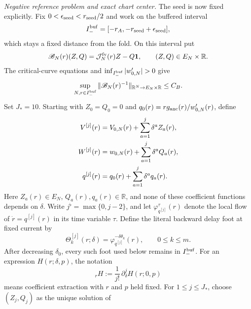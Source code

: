 \begin{lemma}
\smallskip
\noindent
\emph{Negative reference problem and exact chart center.}
The seed is now fixed explicitly.  Fix
\(0<\epsilon_{\rm seed}<r_{\rm seed}/2\) and work on the buffered interval
\[
 I_-^{\rm buf}=[-r_A,-r_{\rm seed}+\epsilon_{\rm seed}],
\]
which stays a fixed distance from the fold.  On this interval put
\begin{equation}
 \mathscr B_N(r)(Z,Q)
 =\mathcal J_N^{\rm fv}(r)Z-Q\mathbf1,\qquad
 (Z,Q)\in E_N\times\mathbb R .                       \label{eq:anchor-seed-normal-block}
\end{equation}
The critical-curve equations and
\(\inf_{I_-^{\rm buf}}|w_{0,N}'|>0\) give
\begin{equation}
 \sup_{N,r\in I_-^{\rm buf}}
 \|\mathscr B_N(r)^{-1}\|_{\mathbb R^N\to E_N\times\mathbb R}
 \le C_B .                                           \label{eq:anchor-seed-normal-inverse}
\end{equation}
Set \(J_*=10\).  Starting with
\(Z_0=Q_0=0\) and
\(q_0(r)=r g_{\rm anc}(r)/w_{0,N}'(r)\), define
\begin{align}
 V^{[j]}(r)&=V_{0,N}(r)+\sum_{a=1}^j\delta^aZ_a(r),\notag\\
 W^{[j]}(r)&=w_{0,N}(r)+\sum_{a=1}^j\delta^aQ_a(r),\notag\\
 q^{[j]}(r)&=q_0(r)+\sum_{a=1}^j\delta^aq_a(r).       \label{eq:anchor-seed-truncations}
\end{align}
Here \(Z_a(r)\in E_N\), \(Q_a(r),q_a(r)\in\mathbb R\), and none of these
coefficient functions depends on \(\delta\).  Write
\(j^\flat=\max\{0,j-2\}\), and let
\(\varphi_{q^{[j]}}^\tau(r)\) denote the local flow of
\(\dot r=q^{[j]}(r)\) in its time variable \(\tau\).  Define the literal
backward delay foot at fixed current by
\begin{equation}
 \Theta_k^{[j]}(r;\delta)
 =\varphi_{q^{[j]}}^{-\delta\theta_k}(r),
 \qquad 0\le k\le m .                                \label{eq:anchor-seed-fixed-current-foot}
\end{equation}
After decreasing \(\delta_0\), every such foot used below remains in
\(I_-^{\rm buf}\).  For an expression \(H(r;\delta,p)\), the notation
\begin{equation}
 [\delta^j]_rH
 :=\frac1{j!}\,\partial_\delta^jH(r;0,p)              \label{eq:anchor-seed-fixed-current-coefficient}
\end{equation}
means coefficient extraction with \(r\) and \(p\) held fixed.  For
\(1\le j\le J_*\), choose \((Z_j,Q_j)\) as the unique solution of
\begin{multline}

\end{multline}
\end{lemma}
